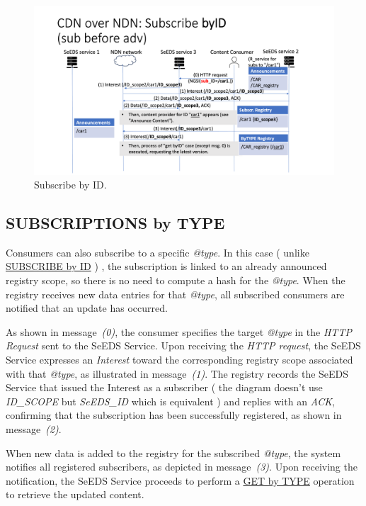 \documentclass{article}
\begin{document}
\begin{figure}[H]
    \centering
    \includegraphics[width=0.8\linewidth]{images/subscribe_by_id.png}
    \caption{Subscribe by ID.}
    \label{fig:subscribe_by_id}
\end{figure}

\subsection{SUBSCRIPTIONS by TYPE}

Consumers can also subscribe to a specific \textit{@type}. In this case ( unlike \hyperref[subscriptions_by_id_section]{SUBSCRIBE by ID} ) , the subscription is linked to an already announced registry scope, so there is no need to compute a hash for the \textit{@type}. When the registry receives new data entries for that \textit{@type}, all subscribed consumers are notified that an update has occurred. 

As shown in message~\emph{(0)}, the consumer specifies the target \textit{@type} in the \emph{HTTP Request} sent to the SeEDS Service. Upon receiving the \emph{HTTP request}, the SeEDS Service expresses an \emph{Interest} toward the corresponding registry scope associated with that \textit{@type}, as illustrated in message~\emph{(1)}. The registry records the SeEDS Service that issued the Interest as a subscriber ( the diagram doesn't use \emph{ID\_SCOPE} but \emph{SeEDS\_ID} which is equivalent ) and replies with an \emph{ACK}, confirming that the subscription has been successfully registered, as shown in message~\emph{(2)}.

When new data is added to the registry for the subscribed \textit{@type}, the system notifies all registered subscribers, as depicted in message~\emph{(3)}. Upon receiving the notification, the SeEDS Service proceeds to perform a \hyperref[get_by_type_section]{GET by TYPE} operation to retrieve the updated content.
\end{document}
